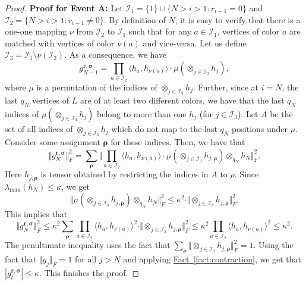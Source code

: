 \documentclass[11pt]{article}
\numberwithin{equation}{section}
\theoremstyle{definition}
\theoremstyle{plain}
\newcommand{\expref}[2]{\hyperref[#2]{#1~\ref{#2}}}
\begin{document}
\begin{proof}
\smallskip
\noindent
\textbf{Proof for Event A: } Let $\mathcal{I}_1 = \{1\} \cup \{N>i > 1: r_{i-1} =0 \}$ and $\mathcal{I}_2 =  \{N>i > 1: r_{i-1}  \neq  0 \}$. By definition of $N$, it is easy to verify that there is a one-one mapping $\nu$ from $\mathcal{I}_2$ to $\mathcal{I}_1$ such that for any $a \in \mathcal{I}_1$, vertices of color $a$ are matched with vertices of color $\nu(a)$ and vice-versa. 
Let us define $\mathcal{I}_3 = \mathcal{I}_1 \setminus \nu(\mathcal{I}_2)$. 
As a consequence, we have $$g^{\mathbf{r}, \boldsymbol{\sigma}}_{N-1} =\prod_{a \in \mathcal{I}_2} \langle h_a , h_{\nu(a)} \rangle \cdot \mu (\otimes_{j \in \mathcal{I}_3} h_j),$$
where $\mu$ is a permutation of the indices of  $\otimes_{j \in \mathcal{I}_3} h_j$. Further, since at $i=N$, the last $q_N$ vertices of $L$ are of at least two different colors, we have that 
the last $q_N$ indices of $\mu (\otimes_{j \in \mathcal{I}_3} h_j)$ belong to more than one $h_j$ (for $j \in \mathcal{I}_3$). Let $A$ be the set of all indices of $\otimes_{j \in \mathcal{I}_3} h_j$ which do not map to the last $q_N$ positions under $\mu$. Consider some assignment $\boldsymbol{\rho}$ for these indices. Then, we have that 
\[
\Vert g^{\mathbf{r}, \boldsymbol{\sigma}}_{N} \Vert_F^2 = \sum_{\boldsymbol{\rho}} \Vert \prod_{a \in \mathcal{I}_2} \langle h_a , h_{\nu(a)} \rangle \cdot \mu (\otimes_{j \in \mathcal{I}_3} h_{j, \boldsymbol{\rho}}) \otimes_{q_N} h_N \Vert_F^2.\]
Here $h_{j, \boldsymbol{\rho}}$ is tensor obtained by restricting the indices in $A$ to $\rho$. Since $\lambda_{\max}(h_N) \le \kappa$, we get
\[
\Vert \mu (\otimes_{j \in \mathcal{I}_3} h_{j, \boldsymbol{\rho}}) \otimes_{q_N} h_N \Vert_F^2 \le \kappa^2 \cdot \Vert \otimes_{j \in \mathcal{I}_3} h_{j, \boldsymbol{\rho}}\Vert_F^2. 
\]
This implies that 
\[
\Vert g^{\mathbf{r}, \boldsymbol{\sigma}}_{N} \Vert_F^2 \le \kappa^2  \sum_{\boldsymbol{\rho}}  \prod_{a \in \mathcal{I}_2} \langle h_a , h_{\nu(a)} \rangle^2 \cdot  \Vert \otimes_{j \in \mathcal{I}_3} h_{j, \boldsymbol{\rho}}\Vert_F^2 \le  \kappa^2 \prod_{a \in \mathcal{I}_2} \langle h_a , h_{\nu(a)} \rangle^2  \le \kappa^2. 
\]
The penultimate inequality uses the fact that $\sum_{\boldsymbol{\rho}}  \Vert \otimes_{j \in \mathcal{I}_3} h_{j, \boldsymbol{\rho}}\Vert_F^2=1$. Using the fact that $\Vert g_j \Vert_F=1$ for all $j>N$ and applying \expref{Fact}{fact:contraction}, we get that $|g^{\mathbf{r}, \boldsymbol{\sigma}}_{t}|\le \kappa$. This finishes the proof.


\end{proof}
\end{document}
